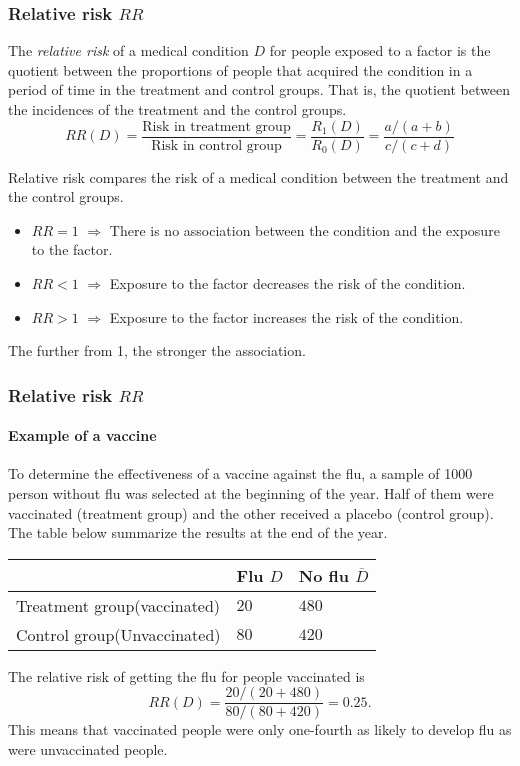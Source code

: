 \begin{frame}
\frametitle{Relative risk $RR$}
\begin{definition}
The \emph{relative risk} of a medical condition $D$ for people exposed to a factor is the quotient between the proportions of people that acquired the condition in a period of time in the treatment and control groups.
That is, the quotient between the incidences of the treatment and the control groups.
\[
  RR(D)=\frac{\mbox{Risk in treatment group}}{\mbox{Risk in control group}}=\frac{R_1(D)}{R_0(D)}=\frac{a/(a+b)}{c/(c+d)}
\]
\end{definition}

Relative risk compares the risk of a medical condition between the treatment and the control groups. 
\begin{itemize}
  \item $RR=1$ $\Rightarrow$ There is no association between the condition and the exposure to the factor. 
  \item $RR<1$ $\Rightarrow$ Exposure to the factor decreases the risk of the condition.
  \item $RR>1$ $\Rightarrow$ Exposure to the factor increases the risk of the condition.
\end{itemize}
The further from 1, the stronger the association. 
\end{frame}


\begin{frame}
\frametitle{Relative risk $RR$}
\framesubtitle{Example of a vaccine}
To determine the effectiveness of a vaccine against the flu, a sample of 1000 person without flu was selected at the beginning of the year.
Half of them were vaccinated (treatment group) and the other received a placebo (control group).
The table below summarize the results at the end of the year. 

\begin{center}
  \begin{tabular}{|m{2.7cm}|m{1.5cm}<{\centering}|m{1.5cm}<{\centering}|}
  \cline{2-3}
  \multicolumn{1}{c|}{} & Flu $D$ & No flu $\overline D$\\ 
  \hline
  Treatment group\newline (vaccinated) & $20$ & $480$\\ 
  \hline 
  Control group\newline (Unvaccinated) & $80$ & $420$\\ 
  \hline
\end{tabular}
\end{center}

The relative risk of getting the flu for people vaccinated is
\[
  RR(D) = \frac{20/(20+480)}{80/(80+420)} = 0.25.
\]
This means that vaccinated people were only one-fourth as likely to develop flu as were unvaccinated people.
\end{frame}


